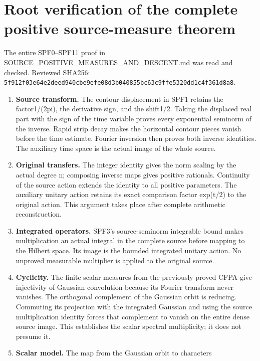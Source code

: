 \section{Root verification of the complete positive source-measure
theorem}\label{root-verification-of-the-complete-positive-source-measure-theorem}

The entire SPF0--SPF11 proof in
SOURCE\_POSITIVE\_MEASURES\_AND\_DESCENT.md was read and checked.
Reviewed SHA256:
\texttt{5f912f03e64e2deed940cbe9efe08d3b040855bc63c9ffe5320dd1c4f361d8a8}.

\begin{enumerate}
\def\labelenumi{\arabic{enumi}.}
\item
  \textbf{Source transform.} The contour displacement in SPF1 retains
  the factor1/(2pi), the derivative sign, and the shift1/2. Taking the
  displaced real part with the sign of the time variable proves every
  exponential seminorm of the inverse. Rapid strip decay makes the
  horizontal contour pieces vanish before the time estimate. Fourier
  inversion then proves both inverse identities. The auxiliary time
  space is the actual image of the whole source.
\item
  \textbf{Original transfers.} The integer identity gives the norm
  scaling by the actual degree n; composing inverse maps gives positive
  rationals. Continuity of the source action extends the identity to all
  positive parameters. The auxiliary unitary action retains its exact
  comparison factor exp(t/2) to the original action. This argument takes
  place after complete arithmetic reconstruction.
\item
  \textbf{Integrated operators.} SPF3's source-seminorm integrable bound
  makes multiplication an actual integral in the complete source before
  mapping to the Hilbert space. Its image is the bounded integrated
  unitary action. No unproved measurable multiplier is applied to the
  original source.
\item
  \textbf{Cyclicity.} The finite scalar measures from the previously
  proved CFPA give injectivity of Gaussian convolution because its
  Fourier transform never vanishes. The orthogonal complement of the
  Gaussian orbit is reducing. Commuting its projection with the
  integrated Gaussian and using the source multiplication identity
  forces that complement to vanish on the entire dense source image.
  This establishes the scalar spectral multiplicity; it does not presume
  it.
\item
  \textbf{Scalar model.} The map from the Gaussian orbit to characters

\end{enumerate}
